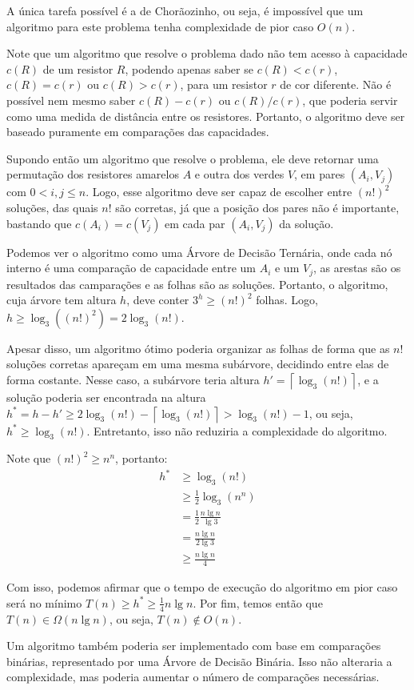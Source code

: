 A única tarefa possível é a de Chorãozinho, ou seja, é impossível que um algoritmo para este problema tenha complexidade de pior caso $O(n)$.

\itemdsep{}

Note que um algoritmo que resolve o problema dado não tem acesso à capacidade $c(R)$ de um resistor $R$, podendo apenas saber se $c(R) < c(r)$, $c(R) = c(r)$ ou $c(R) > c(r)$, para um resistor $r$ de cor diferente. Não é possível nem mesmo saber $c(R) - c(r)$ ou $c(R) / c(r)$, que poderia servir como uma medida de distância entre os resistores. Portanto, o algoritmo deve ser baseado puramente em comparações das capacidades.

Supondo então um algoritmo que resolve o problema, ele deve retornar uma permutação dos resistores amarelos $A$ e outra dos verdes $V$, em pares $(A_i, V_j)$ com $0 < i, j \leq n$. Logo, esse algoritmo deve ser capaz de escolher entre $\left(n!\right)^2$ soluções, das quais $n!$ são corretas, já que a posição dos pares não é importante, bastando que $c(A_i) = c(V_j)$ em cada par $(A_i, V_j)$ da solução.

Podemos ver o algoritmo como uma Árvore de Decisão Ternária, onde cada nó interno é uma comparação de capacidade entre um $A_i$ e um $V_j$, as arestas são os resultados das camparações e as folhas são as soluções. Portanto, o algoritmo, cuja árvore tem altura $h$, deve conter $3^h \geq \left(n!\right)^2$ folhas. Logo, $h \geq \log_3 \left(\left(n!\right)^2\right) = 2 \log_3 \left(n!\right)$.

Apesar disso, um algoritmo ótimo poderia organizar as folhas de forma que as $n!$ soluções corretas apareçam em uma mesma subárvore, decidindo entre elas de forma costante. Nesse caso, a subárvore teria altura $h' = \left\lceil\log_3(n!)\right\rceil$, e a solução poderia ser encontrada na altura $h^* = h - h' \geq 2 \log_3(n!) - \left\lceil\log_3(n!)\right\rceil > \log_3(n!) - 1$, ou seja, $h^* \geq \log_3(n!)$. Entretanto, isso não reduziria a complexidade do algoritmo.

Note que $(n!)^2 \geq n^n$, portanto:
\begin{align*}
    h^* &\geq \log_3(n!) \\
    &\geq \frac{1}{2} \log_3\left(n^n\right) \\
    &= \frac{1}{2} \frac{n \lg n}{\lg 3} \\
    &= \frac{n \lg n}{2 \lg 3} \\
    &\geq \frac{n \lg n}{4}
\end{align*}

Com isso, podemos afirmar que o tempo de execução do algoritmo em pior caso será no mínimo $T(n) \geq h^* \geq \frac{1}{4} n \lg n$. Por fim, temos então que $T(n) \in \Omega(n \lg n)$, ou seja, $T(n) \not\in O(n)$.

Um algoritmo também poderia ser implementado com base em comparações binárias, representado por uma Árvore de Decisão Binária. Isso não alteraria a complexidade, mas poderia aumentar o número de comparações necessárias.
